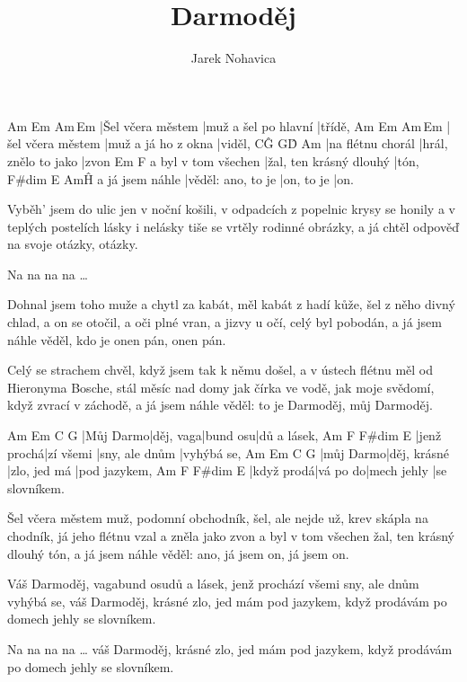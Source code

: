 \documentclass{song}
\author{Jarek Nohavica}
\title{Darmoděj}
\begin{document}
\strophe
Am                Em                   Am\,Em
|Šel včera městem |muž a šel po hlavní |třídě,
Am                Em                  Am\,Em
|šel včera městem |muž a já ho z okna |viděl,
C\^G              G\^D                 Am
|na flétnu chorál |hrál, znělo to jako |zvon
                    Em                      F
a byl v tom všechen |žal, ten krásný dlouhý |tón,
                F\#dim             E          Am\^H
a já jsem náhle |věděl: ano, to je |on, to je |on.
\endstrophe

\strophe*
Vyběh' jsem do ulic jen v noční košili,
v odpadcích z popelnic krysy se honily
a v teplých postelích lásky i nelásky
tiše se vrtěly rodinné obrázky,
a já chtěl odpověď na svoje otázky, otázky.
\endstrophe

Na na na na \ldots
\endstrophe

\strophe*
Dohnal jsem toho muže a chytl za kabát,
měl kabát z hadí kůže, šel z něho divný chlad,
a on se otočil, a oči plné vran,
a jizvy u očí, celý byl pobodán,
a já jsem náhle věděl, kdo je onen pán, onen pán.
\endstrophe

\strophe*
Celý se strachem chvěl, když jsem tak k němu došel,
a v ústech flétnu měl od Hieronyma Bosche,
stál měsíc nad domy jak čírka ve vodě,
jak moje svědomí, když zvrací v záchodě,
a já jsem náhle věděl: to je Darmoděj, můj Darmoděj.
\endstrophe

Am        Em        C        G
|Můj Darmo|děj, vaga|bund osu|dů a lásek,
Am          F         F\#dim         E\7
|jenž prochá|zí všemi |sny, ale dnům |vyhýbá se,
Am        Em           C            G
|můj Darmo|děj, krásné |zlo, jed má |pod jazykem,
Am         F        F\#dim      E\7
|když prodá|vá po do|mech jehly |se slovníkem.
\endstrophe

\strophe*
Šel včera městem muž, podomní obchodník,
šel, ale nejde už, krev skápla na chodník,
já jeho flétnu vzal a zněla jako zvon
a byl v tom všechen žal, ten krásný dlouhý tón,
a já jsem náhle věděl: ano, já jsem on, já jsem on.
\endstrophe

Váš Darmoděj, vagabund osudů a lásek,
jenž prochází všemi sny, ale dnům vyhýbá se,
váš Darmoděj, krásné zlo, jed mám pod jazykem,
když prodávám po domech jehly se slovníkem.
\endstrophe

Na na na na \ldots
váš Darmoděj, krásné zlo, jed mám pod jazykem,
když prodávám po domech jehly se slovníkem.
\endstrophe
\end{document}
